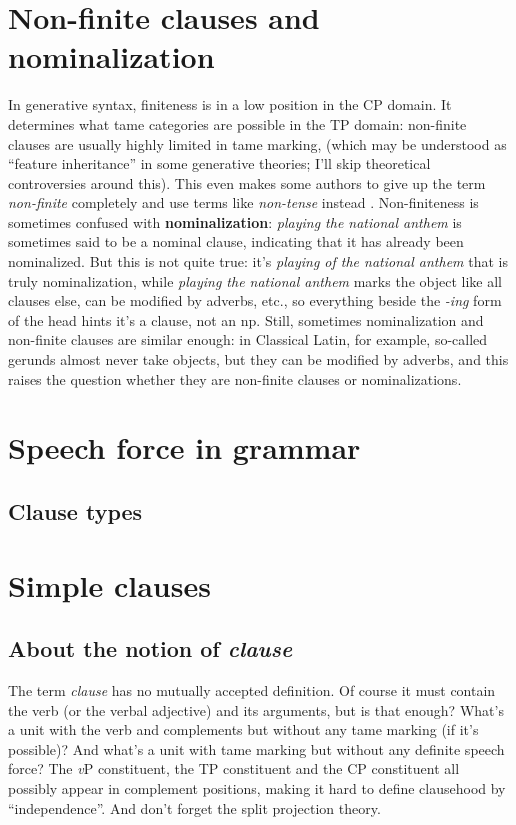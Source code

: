 \documentclass[UTF8, a4paper, oneside, scheme=plain]{ctexart}
\newcommand*{\citesec}[1]{\S~{#1}}
\newcommand*{\concept}[1]{\textbf{#1}}
\newcommand*{\term}[1]{\emph{#1}}
\newcommand*{\corpus}[1]{\emph{#1}}
\newcommand*{\vP}{\textit{v}P}
\begin{document}
\section{Non-finite clauses and nominalization}\label{sec:non-finite}

In generative syntax, finiteness is in a low position in the CP domain.
It determines what \ac{tame} categories are possible in the TP domain:
non-finite clauses are usually highly limited in \ac{tame} marking,
(which may be understood as ``feature inheritance'' in some generative theories; 
I'll skip theoretical controversies around this).
This even makes some authors to give up the term \term{non-finite} completely 
and use terms like \term{non-tense} instead \citep[\citesec{2.2.1}]{dixon2005semantic}.
Non-finiteness is sometimes confused with \concept{nominalization}:
\corpus{playing the national anthem} is sometimes said to be a nominal clause,
indicating that it has already been nominalized.
But this is not quite true:
it's \corpus{playing of the national anthem} that is truly nominalization,
while \corpus{playing the national anthem} marks the object like all clauses else,
can be modified by adverbs, etc.,
so everything beside the \corpus{-ing} form of the head hints it's a clause, not an \ac{np}.
Still, sometimes nominalization and non-finite clauses are similar enough:
in Classical Latin, for example,
so-called gerunds almost never take objects,
but they can be modified by adverbs,
and this raises the question whether they are non-finite clauses or nominalizations.

\section{Speech force in grammar}

\subsection{Clause types}

\section{Simple clauses}

\subsection{About the notion of \term{clause}}

The term \term{clause} has no mutually accepted definition.
Of course it must contain the verb (or the verbal adjective)
and its arguments,
but is that enough?
What's a unit with the verb and complements but without any \ac{tame} marking
(if it's possible)?
And what's a unit with \ac{tame} marking but without any definite speech force? %
The \vP{} constituent, the TP constituent and the CP constituent 
all possibly appear in complement positions,
making it hard to define clausehood by ``independence''.
And don't forget the split projection theory.
\end{document}
